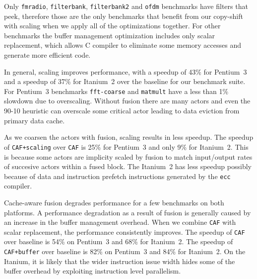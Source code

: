 
Only \texttt{fmradio}, \texttt{filterbank}, \texttt{filterbank2}
and \texttt{ofdm} benchmarks have filters that peek, therefore those are the 
only benchmarks that benefit from our copy-shift with scaling when we 
apply all of the optimizations together. For other benchmarks
the buffer management optimization includes only scalar replacement,
which allows C compiler to eliminate some memory accesses and
generate more efficient code.

In general, scaling improves performance, with a speedup of 
43\% for Pentium~3 and a speedup of 37\% for Itanium~2 over the baseline
for our benchmark suite. For Pentium~3 benchmarks \texttt{fft-coarse} and 
\texttt{matmult} have a less than 1\% slowdown due to overscaling. 
Without fusion there are many actors and even the 90-10 heuristic can 
overscale some critical actor leading to data eviction from primary 
data cache.

As we coarsen the actors with fusion, scaling results in less speedup.
The speedup of \texttt{CAF+scaling} over \texttt{CAF} is
25\% for Pentium~3 and only 9\% for Itanium~2. This is because some actors
are implicity scaled by fusion to match input/output rates of succesive 
actors within a fused block. The Itanium~2 has less speedup possibly
because of data and instruction prefetch instructions generated by the 
\texttt{ecc} compiler.




Cache-aware fusion degrades performance for a few benchmarks on both platforms.
A performance degradation as a result of fusion is generally caused by
an increase in the buffer management overhead. When
we combine \texttt{CAF} with scalar replacement, the
performance consistently improves. 
The speedup of \texttt{CAF} over baseline is 54\% on Pentium~3
and 68\% for Itanium~2. 
The speedup of \texttt{CAF+buffer} over baseline is 82\% on Pentium~3
and 84\% for Itanium~2. 
On the Itanium, it is likely that
the wider instruction issue width hides some of the buffer overhead by
exploiting instruction level parallelism.

